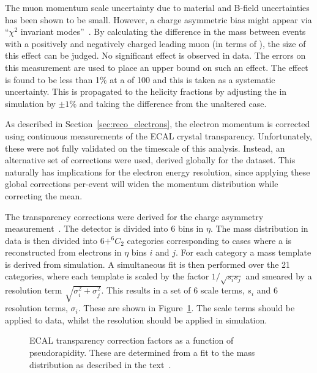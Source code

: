 The muon momentum scale uncertainty due to material and B-field uncertainties
has been shown to be small. However, a charge asymmetric \Pt bias might appear
via ``$\chi^2$ invariant modes''~\cite[section
2.4]{matthias_edelhoff_thesis}. By calculating the difference in the \PZ mass
between events with a positively and negatively charged leading muon (in terms
of \Pt), the size of this effect can be judged. No significant effect is
observed in data. The errors on this measurement are used to place an upper
bound on such an effect. The effect is found to be less than 1\% at a \Ptmu of
\unit{100}{\GeV} and this is taken as a systematic uncertainty. This is
propagated to the helicity fractions by adjusting the \Ptmu in simulation by
$\pm 1\%$ and taking the difference from the unaltered case.

As described in Section~\ref{sec:reco_electrons}, the electron momentum is
corrected using continuous measurements of the \ac{ECAL} crystal
transparency. Unfortunately, these were not fully validated on the timescale of
this analysis. Instead, an alternative set of corrections were used, derived
globally for the dataset. This naturally has implications for the electron
energy resolution, since applying these global corrections per-event will widen
the momentum distribution while correcting the mean.

The transparency corrections were derived for the \PW charge asymmetry
measurement~\cite{w_charge_asymmetry}. The detector is divided into 6 bins in
$\eta$. The \Zee mass distribution in data is then divided into $6 + ^6C_2$
categories corresponding to cases where a \PZ is reconstructed from electrons in
$\eta$ bins $i$ and $j$.  For each category a mass template is derived from
simulation. A simultaneous fit is then performed over the 21 categories, where
each template is scaled by the factor $1/\sqrt{s_is_j}$ and smeared by a
resolution term $\sqrt{\sigma_i^2 + \sigma_j^2}$. This results in a set of 6
scale terms, $s_i$ and 6 resolution terms, $\sigma_i$. These are shown in
Figure~\ref{fig:wpol_ecal_transp_corr}.  The scale terms should be applied to
data, whilst the resolution should be applied in simulation.

\begin{figure}
  \centering
  \quad
  \quad
  \caption{\ac{ECAL} transparency correction factors as a function of
    pseudorapidity. These are determined from a fit to the \PZ mass distribution
    as described in the text~\cite{w_charge_asymmetry_an}.}
\label{fig:wpol_ecal_transp_corr}
\end{figure}


